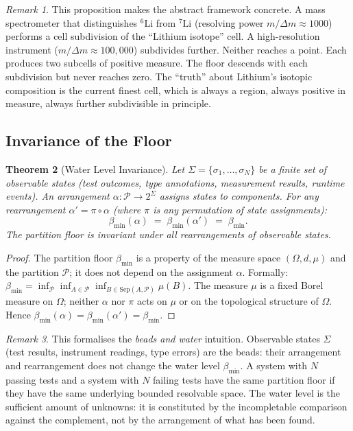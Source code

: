 \documentclass[12pt,a4paper,twocolumn]{article}
\theoremstyle{plain}
\newtheorem{theorem}{Theorem}[section]
\theoremstyle{definition}
\theoremstyle{remark}
\newtheorem{remark}[theorem]{Remark}
\newcommand{\Part}{\mathcal{P}}
\newcommand{\Sep}{\mathrm{Sep}}
\newcommand{\bmin}{\beta_{\min}}
\newcommand{\BRS}{(\Omega,d,\mu)}
\begin{document}
\begin{remark}
This proposition makes the abstract framework concrete.  A mass spectrometer
that distinguishes ${}^6\text{Li}$ from ${}^7\text{Li}$ (resolving power
$m/\Delta m \approx 1000$) performs a cell subdivision of the ``Lithium
isotope'' cell.  A high-resolution instrument ($m/\Delta m \approx 100{,}000$)
subdivides further.  Neither reaches a point.  Each produces two subcells of
positive measure.  The floor descends with each subdivision but never
reaches zero.  The ``truth'' about Lithium's isotopic composition is the
current finest cell, which is always a region, always positive in measure,
always further subdivisible in principle.
\end{remark}

\subsection{Invariance of the Floor}

\begin{theorem}[Water Level Invariance]
\label{thm:water-beads}
Let $\Sigma = \{\sigma_1, \ldots, \sigma_N\}$ be a finite set of
\emph{observable states} (test outcomes, type annotations, measurement
results, runtime events).  An \emph{arrangement} $\alpha : \Part \to
2^\Sigma$ assigns states to components.  For any rearrangement
$\alpha' = \pi \circ \alpha$ (where $\pi$ is any permutation of state
assignments):
\begin{equation}
  \bmin(\alpha) \;=\; \bmin(\alpha') \;=\; \bmin.
\end{equation}
The partition floor is invariant under all rearrangements of observable
states.
\end{theorem}

\begin{proof}
The partition floor $\bmin$ is a property of the measure space $\BRS$ and
the partition $\Part$; it does not depend on the assignment $\alpha$.
Formally: $\bmin = \inf_\Part \inf_{A \in \Part} \inf_{B \in \Sep(A,\Part)}
\mu(B)$.  The measure $\mu$ is a fixed Borel measure on $\Omega$; neither
$\alpha$ nor $\pi$ acts on $\mu$ or on the topological structure of $\Omega$.
Hence $\bmin(\alpha) = \bmin(\alpha') = \bmin$.
\end{proof}

\begin{remark}
This formalises the \emph{beads and water} intuition.  Observable states
$\Sigma$ (test results, instrument readings, type errors) are the beads:
their arrangement and rearrangement does not change the water level $\bmin$.
A system with $N$ passing tests and a system with $N$ failing tests have
the same partition floor if they have the same underlying bounded resolvable
space.  The water level is the sufficient amount of unknowns: it is
constituted by the incompletable comparison against the complement, not by
the arrangement of what has been found.
\end{remark}
\end{document}
